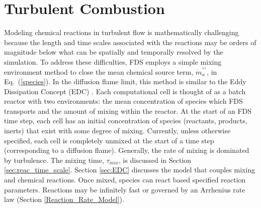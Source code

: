 \section{Turbulent Combustion}

Modeling chemical reactions in turbulent flow is mathematically challenging because the length and time scales associated with the reactions may be orders of magnitude below what can be spatially and temporally resolved by the simulation. To address these difficulties, FDS employs a simple mixing environment method to close the mean chemical source term, $\dot{m}^{\prime\prime\prime}_{\alpha}$, in Eq.~(\ref{species}).  In the diffusion flame limit, this method is similar to the Eddy Dissipation Concept (EDC) \cite{Magnussen:1}. Each computational cell is thought of as a batch reactor with two environments: the mean concentration of species which FDS transports and the amount of mixing within the reactor. At the start of an FDS time step, each cell has an initial concentration of species (reactants, products, inerts) that exist with some degree of mixing. Currently, unless otherwise specified, each cell is completely unmixed at the start of a time step (corresponding to a diffusion flame). Generally, the rate of mixing is dominated by turbulence.  The mixing time, $\tau_{mix}$, is discussed in Section \ref{sec:reac_time_scale}. Section \ref{sec:EDC} discusses the model that couples mixing and chemical reactions. Once mixed, species can react based specified reaction parameters.  Reactions may be infinitely fast or governed by an Arrhenius rate law (Section \ref{Reaction_Rate_Model}). 



